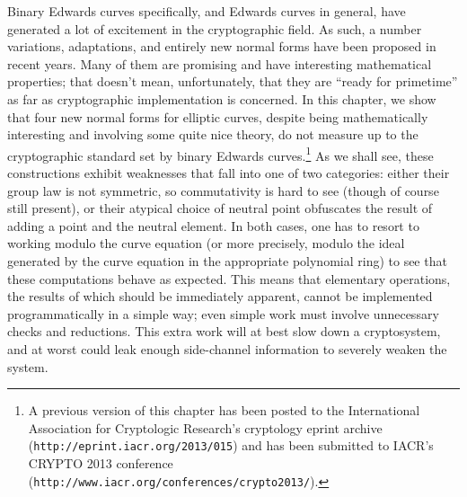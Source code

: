 \label{chp:prax}

Binary Edwards curves specifically, and Edwards curves in general, have
    generated a lot of excitement in the cryptographic field.
As such, a number variations, adaptations, and entirely new normal forms have
    been proposed in recent years.
Many of them are promising and have interesting mathematical properties; that
    doesn't mean, unfortunately, that they are ``ready for primetime'' as far
    as cryptographic implementation is concerned.
In this chapter, we show that four new normal forms for elliptic curves,
    despite being mathematically interesting and involving some quite nice
    theory, do not measure up to the cryptographic standard set by binary
    Edwards curves.\footnote{A previous version of this chapter has been posted
    to the International Association for Cryptologic Research's cryptology
    eprint archive (\texttt{http://eprint.iacr.org/2013/015}) and has been
    submitted to IACR's CRYPTO 2013 conference
    (\texttt{http://www.iacr.org/conferences/crypto2013/}).}
As we shall see, these constructions exhibit weaknesses that fall into one of
    two categories: either their group law is not symmetric, so commutativity
    is hard to see (though of course still present), or their atypical choice
    of neutral point obfuscates the result of adding a point and the neutral
    element.
In both cases, one has to resort to working modulo the curve equation (or more
    precisely, modulo the ideal generated by the curve equation in the
    appropriate polynomial ring) to see that these computations behave as
    expected.
This means that elementary operations, the results of which should be
    immediately apparent, cannot be implemented programmatically in a simple
    way; even simple work must involve unnecessary checks and reductions.
This extra work will at best slow down a cryptosystem, and at worst could leak
    enough side-channel information to severely weaken the system.


